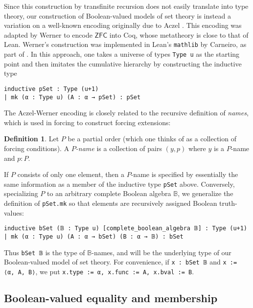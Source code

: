 \documentclass[a4paper,USenglish,cleveref, autoref]{lipics-v2019}
\newcommand{\B}{\mathbb{B}}
\newcommand{\lil}{\lstinline}
\theoremstyle{theorem}
\theoremstyle{definition}
\newtheorem{defn}[definition]{Definition}
\begin{document}
Since this construction by transfinite recursion does not easily translate into type theory, our construction of Boolean-valued models of set theory is instead a variation on a well-known encoding originally due to Aczel \cite{aczel1978type, aczel1986type, aczel1982type}. This encoding was adapted by Werner \cite{werner1997sets} to encode $\mathsf{ZFC}$ into Coq, whose metatheory is close to that of Lean. Werner's construction was implemented in Lean's \texttt{mathlib} by Carneiro, as part of \cite{mario1}. In this approach, one takes a universe of types \texttt{Type u} as the starting point and then imitates the cumulative hierarchy by constructing the inductive type
\begin{lstlisting}
inductive pSet : Type (u+1)
| mk (α : Type u) (A : α → pSet) : pSet
\end{lstlisting}
The Aczel-Werner encoding is closely related to the recursive definition of \emph{names}, which is used in forcing to construct forcing extensions:

\begin{defn}\label{def-p-name}
Let $P$ be a partial order (which one thinks of as a collection of forcing conditions). A \emph{$P$-name} is a collection of pairs $(y, p)$ where $y$ is a $P$-name and $p : P$.
\end{defn}

 If $P$ consists of only one element, then a $P$-name is specified by essentially the same information as a member of the inductive type \lstinline{pSet} above. Conversely, specializing $P$ to an arbitrary complete Boolean algebra $\B$, we generalize the definition of \lstinline{pSet.mk} so that elements are recursively assigned Boolean truth-values:
\begin{lstlisting}
inductive bSet (𝔹 : Type u) [complete_boolean_algebra 𝔹] : Type (u+1)
| mk (α : Type u) (A : α → bSet) (B : α → 𝔹) : bSet
\end{lstlisting}
Thus \lil{bSet 𝔹} is the type of $\B$-names, and will be the underlying type of our Boolean-valued model of set theory. For convenience, if \lstinline{x : bSet 𝔹} and \lstinline{x := ⟨α, A, B⟩}, we put \lstinline{x.type := α, x.func := A, x.bval := B}.

\subsection{Boolean-valued equality and membership}
\end{document}
